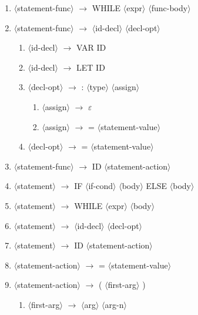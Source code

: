 \documentclass[11spt]{article}
\newcommand{\red}[1]{{\color{red} #1}}
\begin{document}
\begin{enumerate}
\begin{enumerate}
    \end{enumerate}
    \item $\langle$statement-func$\rangle$ $\rightarrow$ \red{WHILE} $\langle$expr$\rangle$ $\langle$func-body$\rangle$
    \item $\langle$statement-func$\rangle$ $\rightarrow$ $\langle$id-decl$\rangle$ $\langle$decl-opt$\rangle$
    \begin{enumerate}
        \item $\langle$id-decl$\rangle$ $\rightarrow$ \red{VAR ID}
        \item $\langle$id-decl$\rangle$ $\rightarrow$ \red{LET ID}
        \item $\langle$decl-opt$\rangle$ $\rightarrow$ \red{:} $\langle$type$\rangle$ $\langle$assign$\rangle$
        \begin{enumerate}
            \item $\langle$assign$\rangle$ $\rightarrow$ \red{$\varepsilon$}
            \item $\langle$assign$\rangle$ $\rightarrow$ \red{=} $\langle$statement-value$\rangle$
        \end{enumerate}
        \item $\langle$decl-opt$\rangle$ $\rightarrow$ \red{=} $\langle$statement-value$\rangle$
    \end{enumerate}
    \item $\langle$statement-func$\rangle$ $\rightarrow$ \red{ID} $\langle$statement-action$\rangle$
    \item $\langle$statement$\rangle$ $\rightarrow$ \red{IF} $\langle$if-cond$\rangle$ $\langle$body$\rangle$ \red{ELSE} $\langle$body$\rangle$
    \item $\langle$statement$\rangle$ $\rightarrow$ \red{WHILE} $\langle$expr$\rangle$ $\langle$body$\rangle$
    \item $\langle$statement$\rangle$ $\rightarrow$ $\langle$id-decl$\rangle$ $\langle$decl-opt$\rangle$
    \item $\langle$statement$\rangle$ $\rightarrow$ \red{ID} $\langle$statement-action$\rangle$
    \item $\langle$statement-action$\rangle$ $\rightarrow$ = $\langle$statement-value$\rangle$
    \item $\langle$statement-action$\rangle$ $\rightarrow$ ( $\langle$first-arg$\rangle$ )
    \begin{enumerate}
        \item $\langle$first-arg$\rangle$ $\rightarrow$ $\langle$arg$\rangle$ $\langle$arg-n$\rangle$

\end{enumerate}
\end{enumerate}
\end{document}
